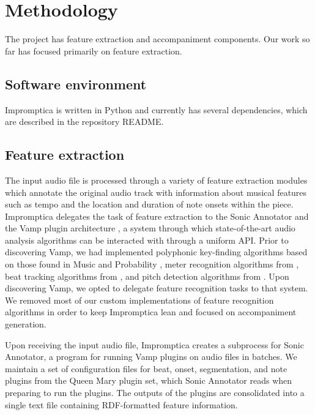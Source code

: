\documentclass[11pt,conference,letterpaper]{IEEEtran}
\begin{document}
\section{Methodology}

The project has feature extraction and accompaniment components. Our work so far has focused primarily on feature extraction.

\subsection{Software environment}

Impromptica is written in Python and currently has several dependencies, which are described in the repository README.

\subsection{Feature extraction}

The input audio file is processed through a variety of feature extraction modules which annotate the original audio track with information about musical features such as tempo and the location and duration of note onsets within the piece. Impromptica delegates the task of feature extraction to the Sonic Annotator and the Vamp plugin architecture \cite{cannam2010sonic}, a system through which state-of-the-art audio analysis algorithms can be interacted with through a uniform API. Prior to discovering Vamp, we had implemented polyphonic key-finding algorithms based on those found in Music and Probability \cite{temperly2007mprob}, meter recognition algorithms from \cite{klapuri2006analysis}, beat tracking algorithms from \cite{ellis2007beat}, and pitch detection algorithms from \cite{klapuri2003multiple}. Upon discovering Vamp, we opted to delegate feature recognition tasks to that system. We removed most of our custom implementations of feature recognition algorithms in order to keep Impromptica lean and focused on accompaniment generation.

Upon receiving the input audio file, Impromptica creates a subprocess for Sonic Annotator, a program for running Vamp plugins on audio files in batches. We maintain a set of configuration files for beat, onset, segmentation, and note plugins from the Queen Mary plugin set, which Sonic Annotator reads when preparing to run the plugins. The outputs of the plugins are consolidated into a single text file containing RDF-formatted feature information.
\end{document}
